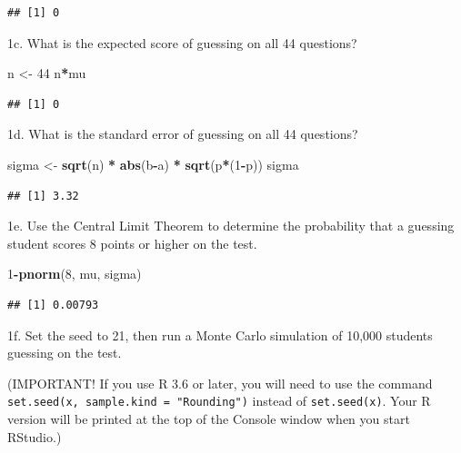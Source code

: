 \documentclass[
]{article}
\newenvironment{Shaded}{\begin{snugshade}}{\end{snugshade}}
\newcommand{\DecValTok}[1]{\textcolor[rgb]{0.00,0.00,0.81}{#1}}
\newcommand{\KeywordTok}[1]{\textcolor[rgb]{0.13,0.29,0.53}{\textbf{#1}}}
\newcommand{\NormalTok}[1]{#1}
\newcommand{\OperatorTok}[1]{\textcolor[rgb]{0.81,0.36,0.00}{\textbf{#1}}}
\newcommand{\StringTok}[1]{\textcolor[rgb]{0.31,0.60,0.02}{#1}}
\begin{document}
\begin{verbatim}
## [1] 0
\end{verbatim}

1c. What is the expected score of guessing on all 44 questions?

\begin{Shaded}
\begin{Highlighting}[]
\NormalTok{n \textless{}{-}}\StringTok{ }\DecValTok{44}
\NormalTok{n}\OperatorTok{*}\NormalTok{mu}
\end{Highlighting}
\end{Shaded}

\begin{verbatim}
## [1] 0
\end{verbatim}

1d. What is the standard error of guessing on all 44 questions?

\begin{Shaded}
\begin{Highlighting}[]
\NormalTok{sigma \textless{}{-}}\StringTok{ }\KeywordTok{sqrt}\NormalTok{(n) }\OperatorTok{*}\StringTok{ }\KeywordTok{abs}\NormalTok{(b}\OperatorTok{{-}}\NormalTok{a) }\OperatorTok{*}\StringTok{ }\KeywordTok{sqrt}\NormalTok{(p}\OperatorTok{*}\NormalTok{(}\DecValTok{1}\OperatorTok{{-}}\NormalTok{p))}
\NormalTok{sigma}
\end{Highlighting}
\end{Shaded}

\begin{verbatim}
## [1] 3.32
\end{verbatim}

1e. Use the Central Limit Theorem to determine the probability that a
guessing student scores 8 points or higher on the test.

\begin{Shaded}
\begin{Highlighting}[]
\DecValTok{1}\OperatorTok{{-}}\KeywordTok{pnorm}\NormalTok{(}\DecValTok{8}\NormalTok{, mu, sigma)}
\end{Highlighting}
\end{Shaded}

\begin{verbatim}
## [1] 0.00793
\end{verbatim}

1f. Set the seed to 21, then run a Monte Carlo simulation of 10,000
students guessing on the test.

(IMPORTANT! If you use R 3.6 or later, you will need to use the command
\texttt{set.seed(x,\ sample.kind\ =\ "Rounding")} instead of
\texttt{set.seed(x)}. Your R version will be printed at the top of the
Console window when you start RStudio.)
\end{document}
